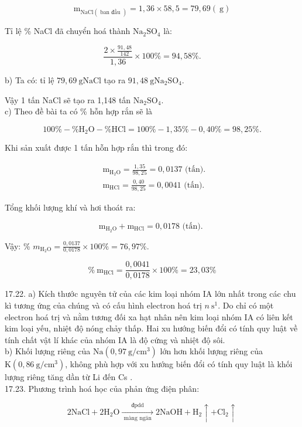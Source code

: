 \documentclass[10pt]{article}
\begin{document}
$$
\mathrm{m}_{\mathrm{NaCl}(\text { ban đầu })}=1,36 \times 58,5=79,69(\mathrm{~g})
$$

Tỉ lệ \% NaCl đã chuyển hoá thành $\mathrm{Na}_{2} \mathrm{SO}_{4}$ là:

$$
\frac{2 \times \frac{91,48}{142}}{1,36} \times 100 \%=94,58 \% .
$$

b) Ta có: tỉ lệ $79,69 \mathrm{~g} \mathrm{NaCl}$ tạo ra $91,48 \mathrm{~g} \mathrm{Na}_{2} \mathrm{SO}_{4}$.

Vậy 1 tấn NaCl sẽ tạo ra 1,148 tấn $\mathrm{Na}_{2} \mathrm{SO}_{4}$.\\
c) Theo đề bài ta có \% hỗn hợp rắn sẽ là

$$
100 \%-\% \mathrm{H}_{2} \mathrm{O}-\% \mathrm{HCl}=100 \%-1,35 \%-0,40 \%=98,25 \% .
$$

Khi sản xuất được 1 tấn hỗn hợp rắn thì trong đó:

$$
\begin{aligned}
& \mathrm{m}_{\mathrm{H}_{2} \mathrm{O}}=\frac{1,35}{98,25}=0,0137 \text { (tấn). } \\
& \mathrm{m}_{\mathrm{HCl}}=\frac{0,40}{98,25}=0,0041 \text { (tấn). }
\end{aligned}
$$

Tổng khối lượng khí và hơi thoát ra:

$$
\mathrm{m}_{\mathrm{H}_{2} \mathrm{O}}+\mathrm{m}_{\mathrm{HCl}}=0,0178 \text { (tấn). }
$$

Vậy: \% $m_{\mathrm{H}_{2} \mathrm{O}}=\frac{0,0137}{0,0178} \times 100 \%=76,97 \%$.

$$
\% \mathrm{~m}_{\mathrm{HCl}}=\frac{0,0041}{0,0178} \times 100 \%=23,03 \%
$$

17.22. a) Kích thước nguyên tử của các kim loại nhóm IA lớn nhất trong các chu kì tương ứng của chúng và có cấu hình electron hoá trị $n \mathrm{~s}^{1}$. Do chỉ có một electron hoá trị và nằm tương đối xa hạt nhân nên kim loại nhóm IA có liên kết kim loại yếu, nhiệt độ nóng chảy thấp. Hai xu hướng biến đổi có tính quy luật về tính chất vật lí khác của nhóm IA là độ cứng và nhiệt độ sôi.\\
b) Khối lượng riêng của $\mathrm{Na}\left(0,97 \mathrm{~g} / \mathrm{cm}^{3}\right)$ lớn hơn khối lượng riêng của $\mathrm{K}\left(0,86 \mathrm{~g} / \mathrm{cm}^{3}\right)$, không phù hợp với xu hướng biến đổi có tính quy luật là khối lượng riêng tăng dần từ Li đến Cs .\\
17.23. Phương trình hoá học của phản ứng điện phân:

$$
2 \mathrm{NaCl}+2 \mathrm{H}_{2} \mathrm{O} \xrightarrow[\text { màng ngăn }]{\text { đpdd }} 2 \mathrm{NaOH}+\mathrm{H}_{2} \uparrow+\mathrm{Cl}_{2} \uparrow
$$
\end{document}
